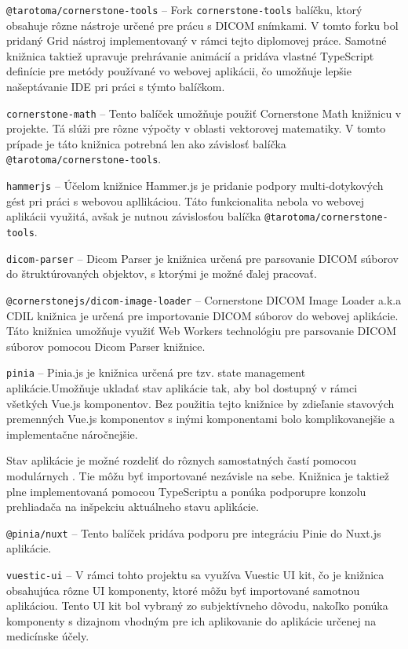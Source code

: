 \texttt{@tarotoma/cornerstone-tools} -- Fork \texttt{cornerstone-tools} balíčku, ktorý obsahuje rôzne nástroje určené pre prácu s DICOM snímkami. V tomto forku bol pridaný Grid nástroj implementovaný v rámci tejto diplomovej práce. Samotné knižnica taktiež upravuje prehrávanie animácií a pridáva vlastné TypeScript definície pre metódy používané vo webovej aplikácii, čo umožňuje lepšie našeptávanie IDE pri práci s týmto balíčkom.

\texttt{cornerstone-math} -- Tento balíček umožňuje použiť Cornerstone Math knižnicu v projekte. Tá slúži pre rôzne výpočty v oblasti vektorovej matematiky. V tomto prípade je táto knižnica potrebná len ako závislosť balíčka \texttt{@tarotoma/cornerstone-tools}.

\texttt{hammerjs} -- Účelom knižnice Hammer.js je pridanie podpory multi-dotykových gést pri práci s webovou apllikáciou. Táto funkcionalita nebola vo webovej aplikácii využitá, avšak je nutnou závislosťou balíčka \texttt{@tarotoma/cornerstone-tools}.

\texttt{dicom-parser} -- Dicom Parser je knižnica určená pre parsovanie DICOM súborov do štruktúrovaných objektov, s ktorými je možné ďalej pracovať.

\texttt{@cornerstonejs/dicom-image-loader} -- Cornerstone DICOM Image Loader a.k.a CDIL knižnica je určená pre importovanie DICOM súborov do webovej aplikácie. Táto knižnica umožňuje využiť Web Workers technológiu pre parsovanie DICOM súborov pomocou Dicom Parser knižnice.

\texttt{pinia} -- Pinia.js je knižnica určená pre tzv. state management aplikácie.\newline Umožňuje ukladať stav aplikácie tak, aby bol dostupný v rámci všetkých Vue.js komponentov. Bez použitia tejto knižnice by zdieľanie stavových premenných Vue.js komponentov s inými komponentami bolo komplikovanejšie a implementačne náročnejšie.

Stav aplikácie je možné rozdeliť do rôznych samostatných častí pomocou modulárnych . Tie môžu byť importované nezávisle na sebe. Knižnica je taktiež plne implementovaná pomocou TypeScriptu a ponúka podporu\newline pre konzolu prehliadača na inšpekciu aktuálneho stavu aplikácie.

\texttt{@pinia/nuxt} -- Tento balíček pridáva podporu pre integráciu Pinie do Nuxt.js aplikácie.

\texttt{vuestic-ui} -- V rámci tohto projektu sa využíva Vuestic UI kit, čo je knižnica obsahujúca rôzne UI komponenty, ktoré môžu byť importované samotnou aplikáciou. Tento UI kit bol vybraný zo subjektívneho dôvodu, nakoľko ponúka komponenty s dizajnom vhodným pre ich aplikovanie do aplikácie určenej na medicínske účely.

